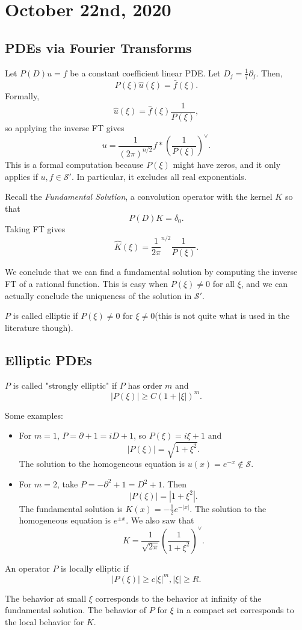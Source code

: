 \documentclass[11pt]{scrartcl}
\renewcommand{\hat}{\widehat}
\begin{document}
\section{October 22nd, 2020}
\subsection{PDEs via Fourier Transforms}
Let $P(D)u = f$ be a constant coefficient linear PDE.  Let $D_j = \frac{1}{i} \partial_j$.  Then,
$$P(\xi)\hat{u}(\xi) = \hat{f}(\xi).$$
Formally, 
$$\hat{u}(\xi) = \hat{f}(\xi) \frac{1}{P(\xi)},$$
so applying the inverse FT gives 
$$u = \frac{1}{(2\pi)^{n/2}}f *\left(\frac{1}{P(\xi)}\right)^\vee.$$
This is a formal computation because $P(\xi)$ might have zeros, and it only applies if $u, f \in \mathcal S'$.  In particular, it excludes all real exponentials.

Recall the \textit{Fundamental Solution}, a convolution operator with the kernel $K$ so that 
$$P(D)K = \delta_0.$$
Taking FT gives
$$\hat{K}(\xi) = \frac{1}{2\pi}^{n/2}\frac{1}{P(\xi)}.$$

We conclude that we can find a fundamental solution by computing the inverse FT of a rational function.  This is easy when $P(\xi) \ne 0$ for all $\xi$, and we can actually conclude the uniqueness of the solution in $\mathcal S'$.  
\begin{definition} $P$ is called elliptic if $P(\xi) \ne 0$  for $\xi \ne 0$(this is not quite what is used in the literature though).
\end{definition}
\subsection{Elliptic PDEs}
\begin{definition} $P$ is called "strongly elliptic" if $P$ has order $m$ and 
$$|P(\xi)| \ge C(1 + |\xi|)^m.$$
\end{definition}
Some examples:
\begin{itemize}
\item For $m = 1$, $P = \partial + 1 = iD + 1$, so $P(\xi) = i\xi + 1$ and 
$$|P(\xi)| = \sqrt{1 + \xi^2}.$$  
The solution to the homogeneous equation is $u(x) = e^{-x} \not \in \mathcal S$.
\item For $m = 2$, take $P = -\partial^2 + 1 = D^2 + 1$.  Then
$$|P(\xi)| = |1 + \xi^2|.$$
The fundamental solution is $K(x) = -\frac{1}{2}e^{-|x|}$.  The solution to the homogeneous equation is $e^{\pm x}$.   We also saw that 
$$K = \frac{1}{\sqrt{2\pi}}\left (\frac{1}{1+\xi^2}\right )^\vee.$$
\end{itemize}
\begin{definition} An operator $P$ is locally elliptic if 
$$|P(\xi)| \ge c|\xi|^m, |\xi| \ge R.$$
\end{definition}
The behavior at small $\xi$ corresponds to the behavior at infinity of the fundamental solution.  The behavior of $P$ for $\xi$ in a compact set corresponds to the local behavior for $K$.
\end{document}
